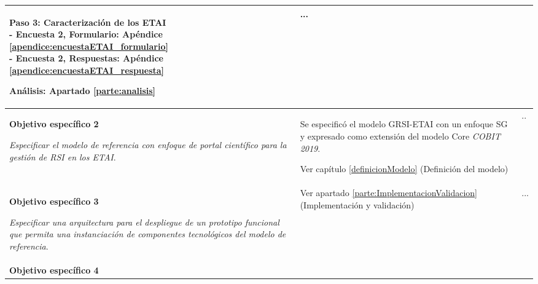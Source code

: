 \begin{table}[!ht]
{\begin{minipage}{\textwidth}
\begin{tabular}{|p{6cm}|p{6cm}|p{8cm}|}
{                    \textbf{Paso 3}: Caracterización de los \acrshort{ETAI}\\
                    - Encuesta 2, Formulario: Apéndice \ref{apendice:encuestaETAI_formulario}\\
                    - Encuesta 2, Respuestas: Apéndice \ref{apendice:encuestaETAI_respuesta}\\

                    \textbf{Análisis}: Apartado \ref{parte:analisis}\\
                }
                &\parbox[t]{6cm}{
                    ...
                }\\
                \hline


                \parbox[t]{6cm}{
                    \textbf{Objetivo específico 2}\\

                    \textit{Especificar el modelo de referencia con enfoque de portal científico para la gestión de \acrshort{RSI} en los \acrshort{ETAI}}.
                }

                &\parbox[t]{6cm}{

                Se especificó el modelo \acrfull{GRSI-ETAI} con un enfoque \acrlong{SG} y expresado como extensión del modelo Core \textit{COBIT 2019}.

                Ver capítulo \ref{definicionModelo} (Definición del modelo)

                }
                & .. \\ \hline

                \parbox[t]{6cm}{
                    \textbf{Objetivo específico 3}\\

                    \textit{Especificar una arquitectura para el despliegue de un prototipo funcional que permita una instanciación de componentes tecnológicos del modelo de referencia}.
                }

                &\parbox[t]{6cm}{
                    Ver apartado \ref{parte:ImplementacionValidacion} (Implementación y validación)
                }
                &\parbox[t]{6cm}{
                    ...
                }
                \\ \hline

                \parbox[t]{6cm}{
                    \textbf{Objetivo específico 4}\\

}
\end{tabular}
\end{minipage}}
\end{table}
